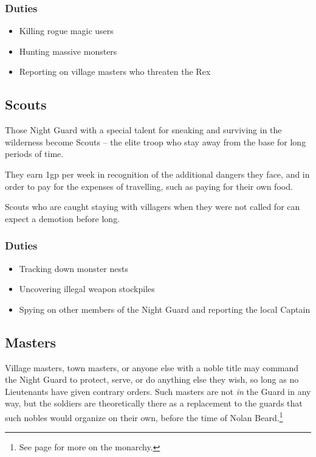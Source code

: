 \begin{multicols}{2}
\subsubsection{Duties}

\begin{itemize}

	\item{Killing rogue magic users}
	\item{Hunting massive monsters}
	\item{Reporting on village masters who threaten the Rex}
\end{itemize}

\subsection{Scouts}

Those Night Guard with a special talent for sneaking and surviving in the wilderness become Scouts -- the elite troop who stay away from the base for long periods of time.

They earn 1gp per week in recognition of the additional dangers they face, and in order to pay for the expenses of travelling, such as paying for their own food.

Scouts who are caught staying with villagers when they were not called for can expect a demotion before long.

\subsubsection{Duties}

\begin{itemize}

	\item{Tracking down monster nests}
	\item{Uncovering illegal weapon stockpiles}
	\item{Spying on other members of the Night Guard and reporting the local Captain}

\end{itemize}

\subsection{Masters}

Village masters, town masters, or anyone else with a noble title may command the Night Guard to protect, serve, or do anything else they wish, so long as no Lieutenants have given contrary orders.
Such masters are not \textit{in} the Guard in any way, but the soldiers are theoretically there as a replacement to the guards that such nobles would organize on their own, before the time of Nolan Beard.\footnote{See page \pageref{nolan} for more on the monarchy.}


\end{multicols}
